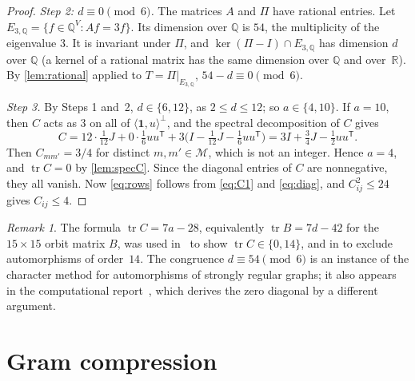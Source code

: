 \documentclass[11pt,a4paper]{amsart}
\theoremstyle{definition}
\theoremstyle{remark}
\newtheorem{remark}[theorem]{Remark}
\newcommand{\Q}{\mathbb{Q}}
\newcommand{\R}{\mathbb{R}}
\newcommand{\one}{\mathbf{1}}
\newcommand{\cM}{\mathcal{M}}
\newcommand{\T}{\mathsf{T}}
\newcommand{\tr}{\operatorname{tr}}
\begin{document}
\begin{proof}
\emph{Step 2: $d\equiv0\pmod 6$.} The matrices $A$ and $\Pi$ have rational entries. Let
$E_{3,\Q}=\{f\in\Q^V:Af=3f\}$. Its dimension over $\Q$ is $54$, the multiplicity of the eigenvalue $3$. It is
invariant under $\Pi$, and $\ker(\Pi-I)\cap E_{3,\Q}$ has dimension $d$ over $\Q$ (a kernel of a rational
matrix has the same dimension over $\Q$ and over~$\R$). By \cref{lem:rational} applied to
$T=\Pi|_{E_{3,\Q}}$, $54-d\equiv0\pmod6$.

\emph{Step 3.} By Steps 1 and~2, $d\in\{6,12\}$, as $2\le d\le 12$; so $a\in\{4,10\}$. If $a=10$, then $C$
acts as $3$ on all of $\langle\one,u\rangle^\perp$, and the spectral decomposition of $C$ gives
\[
C=12\cdot\tfrac1{12}J+0\cdot\tfrac16uu^{\T}+3\bigl(I-\tfrac1{12}J-\tfrac16uu^{\T}\bigr)=3I+\tfrac34J-\tfrac12uu^{\T}.
\]
Then $C_{mm'}=3/4$ for distinct $m,m'\in\cM$, which is not an integer. Hence $a=4$, and $\tr C=0$ by
\cref{lem:specC}. Since the diagonal entries of $C$ are nonnegative, they all vanish. Now \eqref{eq:rows}
follows from \eqref{eq:C1} and \eqref{eq:diag}, and $C_{ij}^2\le24$ gives $C_{ij}\le4$.
\end{proof}

\begin{remark}
The formula $\tr C=7a-28$, equivalently $\tr B=7d-42$ for the $15\times15$ orbit matrix $B$, was used
in~\cite[\S8]{LM14} to show $\tr C\in\{0,14\}$, and in \cite[proof of Theorem~3.11]{CW25} to exclude
automorphisms of order~$14$. The congruence $d\equiv54\pmod 6$ is an instance of the character method for
automorphisms of strongly regular graphs; it also appears in the computational report~\cite{Wa26}, which
derives the zero diagonal by a different argument.
\end{remark}

\section{Gram compression}\label{sec:gram}
\end{document}
